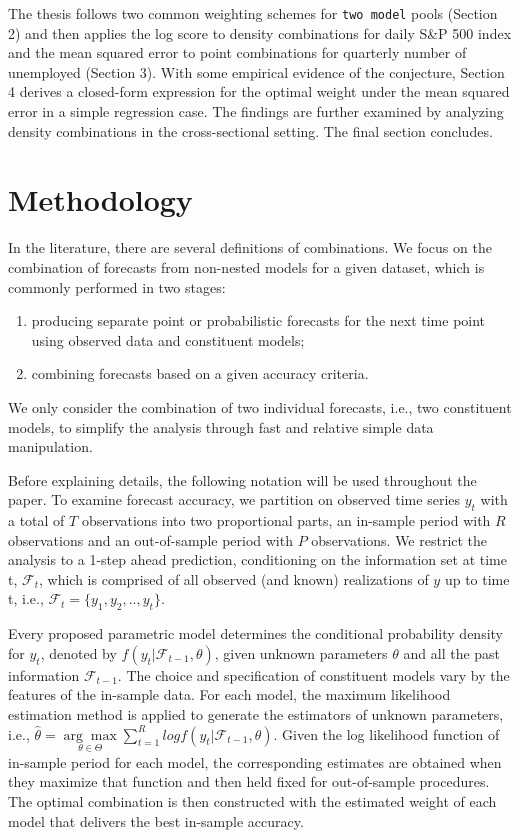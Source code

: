 \documentclass{monashthesis}
\begin{document}
The thesis follows two common weighting schemes for \texttt{two\ model} pools (Section 2) and then applies the log score to density combinations for daily S\&P 500 index and the mean squared error to point combinations for quarterly number of unemployed (Section 3). With some empirical evidence of the conjecture, Section 4 derives a closed-form expression for the optimal weight under the mean squared error in a simple regression case. The findings are further examined by analyzing density combinations in the cross-sectional setting. The final section concludes.

\hypertarget{method}{%
\chapter{Methodology}\label{method}}

In the literature, there are several definitions of combinations. We focus on the combination of forecasts from non-nested models for a given dataset, which is commonly performed in two stages:

\begin{enumerate}
\def\labelenumi{\arabic{enumi}.}
\item
  producing separate point or probabilistic forecasts for the next time point using observed data and constituent models;
\item
  combining forecasts based on a given accuracy criteria.
\end{enumerate}

We only consider the combination of two individual forecasts, i.e., two constituent models, to simplify the analysis through fast and relative simple data manipulation.

Before explaining details, the following notation will be used throughout the paper. To examine forecast accuracy, we partition on observed time series \(y_t\) with a total of \(T\) observations into two proportional parts, an in-sample period with \(R\) observations and an out-of-sample period with \(P\) observations. We restrict the analysis to a 1-step ahead prediction, conditioning on the information set at time t, \(\mathcal{F}_t\), which is comprised of all observed (and known) realizations of \(y\) up to time t, i.e., \(\mathcal{F}_t = \{y_1, y_2, .., y_t\}\).

Every proposed parametric model determines the conditional probability density for \(y_t\), denoted by \(f(y_t|\mathcal{F}_{t-1}, \theta)\), given unknown parameters \(\theta\) and all the past information \(\mathcal{F}_{t-1}\). The choice and specification of constituent models vary by the features of the in-sample data. For each model, the maximum likelihood estimation method is applied to generate the estimators of unknown parameters, i.e., \(\hat\theta = \underset{\theta \in \Theta}{\arg\max} \sum^R_{t=1} log f(y_t|\mathcal{F}_{t-1}, \theta)\). Given the log likelihood function of in-sample period for each model, the corresponding estimates are obtained when they maximize that function and then held fixed for out-of-sample procedures. The optimal combination is then constructed with the estimated weight of each model that delivers the best in-sample accuracy.
\end{document}
